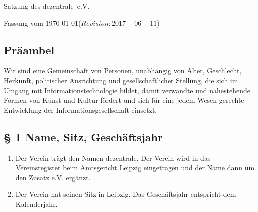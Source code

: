 ﻿\documentclass[10pt,a4paper]{scrartcl}
\newcommand{\qs}[1]{\glqq#1\grqq}
\newcommand{\name}{dezentrale}
\newcommand{\revision}{$Revision: 2017-06-11 $}
\begin{document}
{\LARGE Satzung des \name\ e.V.}

Fassung vom \today (\revision)

\subsection*{Präambel}



Wir sind eine Gemeinschaft von Personen, unabhängig von Alter,
Geschlecht, Herkunft, politischer Ausrichtung und gesellschaftlicher
Stellung, die sich im Umgang mit Informationstechnologie bildet, damit
verwandte und nahestehende Formen von Kunst und Kultur fördert und sich für
eine jedem Wesen gerechte Entwicklung der Informationsgesellschaft
einsetzt.
%
%
\subsection*{§ 1 Name, Sitz, Geschäftsjahr}
\begin{enumerate}
\item Der Verein trägt den Namen \qs{\name}. Der Verein wird in das
Vereinsregister beim Amtsgericht Leipzig eingetragen
und der Name dann um den Zusatz \qs{e.V.} ergänzt.
\item Der Verein hat seinen Sitz in Leipzig. Das Geschäftsjahr entspricht
dem Kalenderjahr.
\end{enumerate}
%
%
\end{document}
